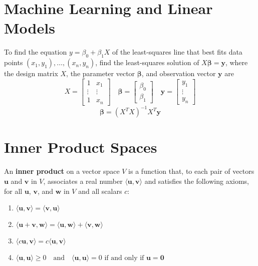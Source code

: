 \documentclass{article}
\begin{document}
\pagebreak

\section*{Machine Learning and Linear Models}

To find the equation $y=\beta_0 + \beta_1 X$ of the least-squares line that best fits data points
$(x_1, y_1), \ldots, (x_n, y_n)$, find the least-squares solution of $X\mathbf{\beta}=\mathbf{y}$,
where the design matrix $X$, the parameter vector $\mathbf{\beta}$, and observation vector
$\mathbf{y}$ are
\[X=\begin{bmatrix}
    1 & x_1 \\ 
    \vdots & \vdots \\
    1 & x_n
\end{bmatrix}\quad \mathbf{\beta} = \begin{bmatrix}
    \beta_0 \\
    \beta_1
\end{bmatrix}\quad \mathbf{y} = \begin{bmatrix}
    y_1 \\
    \vdots \\
    y_n
\end{bmatrix}\]
\[\mathbf{\beta}={(X^T X)}^{-1} X^T \mathbf{y}\]

\section*{Inner Product Spaces}

An \textbf{inner product} on a vector space $V$ is a function that, to each pair of vectors
$\mathbf{u}$ and $\mathbf{v}$ in $V$, associates a real number
$\langle\mathbf{u},\mathbf{v}\rangle$ and satisfies the following axioms, for all $\mathbf{u}$,
$\mathbf{v}$, and $\mathbf{w}$ in $V$ and all scalars $c$:
\begin{enumerate}
    \item $\langle\mathbf{u},\mathbf{v}\rangle=\langle\mathbf{v},\mathbf{u}\rangle$
    \item $\langle\mathbf{u+v},\mathbf{w}\rangle=\langle\mathbf{u},\mathbf{w}\rangle+\langle
    \mathbf{v},\mathbf{w}\rangle$
    \item $\langle c\mathbf{u},\mathbf{v}\rangle=c\langle\mathbf{u},\mathbf{v}\rangle$
    \item $\langle\mathbf{u},\mathbf{u}\rangle\geq 0\quad\text{and}\quad\langle\mathbf{u},
    \mathbf{u}\rangle=0\text{ if and only if }\mathbf{u=0}$
\end{enumerate}
\end{document}
